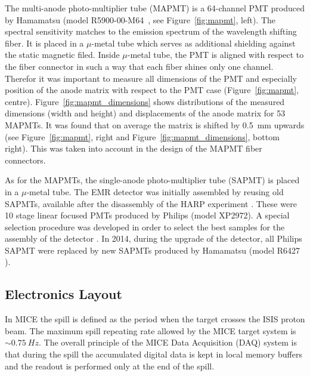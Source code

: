 \documentclass[a4paper,11pt]{article}
\begin{document}
The multi-anode photo-multiplier tube (MAPMT) is a 64-channel PMT produced by Hamamatsu (model R5900-00-M64~\cite{hamamatsu_mapmt}, see
Figure~\ref{fig:mapmt}, left). The spectral sensitivity matches to the emission spectrum of the wavelength shifting fiber. It is 
placed in a $\mu$-metal tube  which serves as additional shielding against the static magnetic filed. Inside $\mu$-metal tube, the PMT
is aligned with respect to the fiber connector in such a way that each fiber shines only one
channel. Therefor it was important to measure all dimensions of the PMT and especially position of the anode matrix with respect to the
PMT case (Figure~\ref{fig:mapmt}, centre). Figure~\ref{fig:mapmt_dimensions} shows distributions of the measured dimensions (width and
height) and displacements of the anode matrix for 53 MAPMTs. It was found that on average the matrix is shifted by 0.5~mm upwards (see
Figure~\ref{fig:mapmt}, right and Figure~\ref{fig:mapmt_dimensions}, bottom right). This was taken into account in the design of the
MAPMT fiber connectors.

As for the MAPMTs, the single-anode photo-multiplier tube (SAPMT) is placed in a $\mu$-metal tube. The EMR detector was initially assembled
by reusing old SAPMTs, available after the disassembly of the HARP experiment \cite{harp}. These were 10 stage linear focused PMTs produced
by Philips (model XP2972). A special selection procedure was developed in order to select the best samples for the assembly of the detector
\cite{philips}. In 2014, during the upgrade of the detector, all Philips SAPMT were replaced by new SAPMTs produced by Hamamatsu (model R6427
\cite{hamamatsu_mapmt}).

\subsection{Electronics Layout}
In MICE the spill is defined as the period when the target crosses the ISIS proton beam. The maximum spill repeating rate allowed by the
MICE target system is $\sim 0.75 \ Hz$. The overall principle of the MICE Data Acquisition (DAQ) system is that during the spill the accumulated
digital data is kept in local memory buffers and the readout is performed only at the end of the spill.
\end{document}
